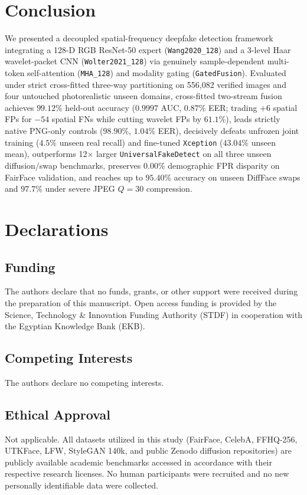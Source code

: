 \documentclass[fleqn,10pt]{wlscirep}
\begin{document}
\section*{Conclusion}
We presented a decoupled spatial-frequency deepfake detection framework integrating a 128-D RGB ResNet-50 expert (\texttt{Wang2020\_128}) and a 3-level Haar wavelet-packet CNN (\texttt{Wolter2021\_128}) via genuinely sample-dependent multi-token self-attention (\texttt{MHA\_128}) and modality gating (\texttt{GatedFusion}). Evaluated under strict cross-fitted three-way partitioning on 556,082 verified images and four untouched photorealistic unseen domains, cross-fitted two-stream fusion achieves $99.12\%$ held-out accuracy ($0.9997$ AUC, $0.87\%$ EER; trading $+6$ spatial FPs for $-54$ spatial FNs while cutting wavelet FPs by $61.1\%$), leads strictly native PNG-only controls ($98.90\%$, $1.04\%$ EER), decisively defeats unfrozen joint training ($4.5\%$ unseen real recall) and fine-tuned \texttt{Xception} ($43.04\%$ unseen mean), outperforms 12$\times$ larger \texttt{UniversalFakeDetect} on all three unseen diffusion/swap benchmarks, preserves $0.00\%$ demographic FPR disparity on FairFace validation, and reaches up to $95.40\%$ accuracy on unseen DiffFace swaps and $97.7\%$ under severe JPEG $Q=30$ compression.

\section*{Declarations}

\subsection*{Funding}
The authors declare that no funds, grants, or other support were received during the preparation of this manuscript. Open access funding is provided by the Science, Technology \& Innovation Funding Authority (STDF) in cooperation with the Egyptian Knowledge Bank (EKB).

\subsection*{Competing Interests}
The authors declare no competing interests.

\subsection*{Ethical Approval}
Not applicable. All datasets utilized in this study (FairFace, CelebA, FFHQ-256, UTKFace, LFW, StyleGAN 140k, and public Zenodo diffusion repositories) are publicly available academic benchmarks accessed in accordance with their respective research licenses. No human participants were recruited and no new personally identifiable data were collected.
\end{document}
